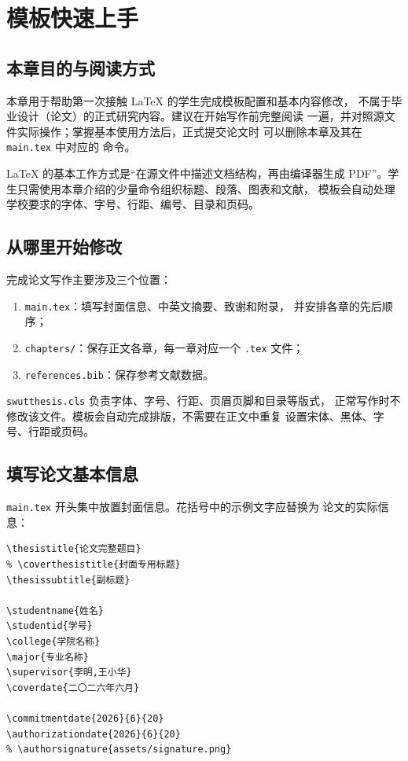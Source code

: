 \chapter{模板快速上手}

\section{本章目的与阅读方式}

本章用于帮助第一次接触 LaTeX 的学生完成模板配置和基本内容修改，
不属于毕业设计（论文）的正式研究内容。建议在开始写作前完整阅读
一遍，并对照源文件实际操作；掌握基本使用方法后，正式提交论文时
可以删除本章及其在 \texttt{main.tex} 中对应的
\verb|| 命令。

LaTeX 的基本工作方式是“在源文件中描述文档结构，再由编译器生成
PDF”。学生只需使用本章介绍的少量命令组织标题、段落、图表和文献，
模板会自动处理学校要求的字体、字号、行距、编号、目录和页码。

\section{从哪里开始修改}

完成论文写作主要涉及三个位置：
\begin{enumerate}
  \item \texttt{main.tex}：填写封面信息、中英文摘要、致谢和附录，
        并安排各章的先后顺序；
  \item \texttt{chapters/}：保存正文各章，每一章对应一个
        \texttt{.tex} 文件；
  \item \texttt{references.bib}：保存参考文献数据。
\end{enumerate}

\texttt{swutthesis.cls} 负责字体、字号、行距、页眉页脚和目录等版式，
正常写作时不修改该文件。模板会自动完成排版，不需要在正文中重复
设置宋体、黑体、字号、行距或页码。

\section{填写论文基本信息}

\texttt{main.tex} 开头集中放置封面信息。花括号中的示例文字应替换为
论文的实际信息：

\begin{lstlisting}[language={[LaTeX]TeX}]
\thesistitle{论文完整题目}
% \coverthesistitle{封面专用标题}
\thesissubtitle{副标题}

\studentname{姓名}
\studentid{学号}
\college{学院名称}
\major{专业名称}
\supervisor{李明,王小华}
\coverdate{二〇二六年六月}

\commitmentdate{2026}{6}{20}
\authorizationdate{2026}{6}{20}
% \authorsignature{assets/signature.png}
\end{lstlisting}


